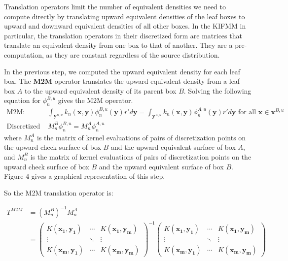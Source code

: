 Translation operators limit the number of equivalent densities we need to compute directly by translating upward equivalent densities of the leaf boxes to upward and downward equivalent densities of all other boxes. In the KIFMM in particular, the translation operators in their discretized form are matrices that translate an equivalent density from one box to that of another. They are a pre-computation, as they are constant regardless of the source distribution.

In the previous step, we computed the upward equivalent density for each leaf box. The \textbf{M2M} operator translates the upward equivalent density from a leaf box $A$ to the upward equivalent density of its parent box $B$. Solving the following equation for $\phi_n^{B,u}$ gives the M2M operator.
\begin{align}
\mbox{M2M: }&\int_{\mathbf{y}^{B,u}}{k_n(\mathbf{x},\mathbf{y})}\phi^{B,u}_n{(\mathbf{y})}r'd\mathbf{y} = \int_{\mathbf{y}^{A,u}}{k_n(\mathbf{x},\mathbf{y})}\phi^{A,u}_n{(\mathbf{y})}r'd\mathbf{y}\mbox{ for all }\mathbf{x}\in\mathbf{x}^{B,u}\\
\mbox{Discretized M2M: }&M_n^B\phi^{B,u}_n=M_n^A\phi^{A,u}_n
\end{align}
where $M_n^A$ is the matrix of kernel evaluations of pairs of discretization points on the upward check surface of box $B$ and the upward equivalent surface of box $A$, and $M_n^B$ is the matrix of kernel evaluations of pairs of discretization points on the upward check surface of box $B$ and the upward equivalent surface of box $B$. Figure 4 gives a graphical representation of this step.

So the M2M translation operator is:

\begin{align}
T^{M2M} &= (M_n^B)^{-1}M_n^A\\
&= \begin{pmatrix}
  K(\mathbf{x_1},\mathbf{y_1}) & \cdots & K(\mathbf{x_1},\mathbf{y_m})  \\
  \vdots  & \ddots & \vdots  \\
  K(\mathbf{x_m},\mathbf{y_1}) & \cdots & K(\mathbf{x_m},\mathbf{y_m}) 
 \end{pmatrix}^{-1}\begin{pmatrix}
  K(\mathbf{x_1},\mathbf{y_1}) & \cdots & K(\mathbf{x_1},\mathbf{y_m})  \\
  \vdots  & \ddots & \vdots  \\
  K(\mathbf{x_m},\mathbf{y_1}) & \cdots & K(\mathbf{x_m},\mathbf{y_m}) 
 \end{pmatrix}
\end{align}


